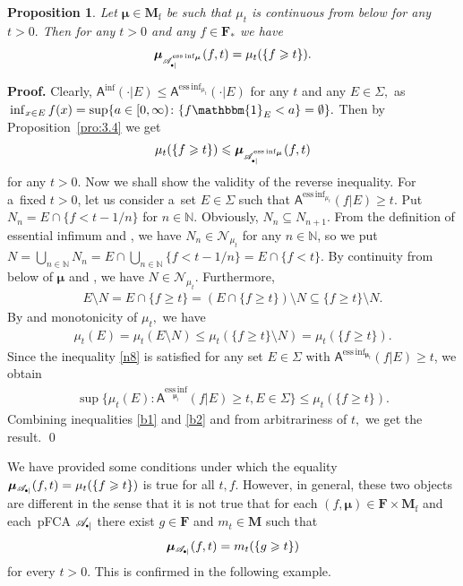 \documentclass[preprint,11pt]{elsarticle}
\newtheorem{proposition}[tw]{Proposition}
\theoremstyle{definition}
\renewenvironment{proof}[1][\textbf{Proof}]{\noindent\textbf{#1.} }{\hfill\qed\vspace{2.5ex}}
\newcommand\mN{{\mathbb N}}
\newcommand\bF{\mathbf{F}} %
\newcommand\bFa{\mathbf{F}_{\ast}} %
\newcommand\bM{\mathbf{M}} %
\newcommand\bMf{\mathbf{M}_{\mathrm{f}}}%
\newcommand\sA{\mathsf{A}}
\newcommand\sbullet[1][.5]{\mathbin{\vcenter{\hbox{\scalebox{#1}{$\bullet$}}}}}
\newcommand\bpA{\mathscr {A}_{\sbullet|}}%
\newcommand\bpeA{\mathscr {A}_{\sbullet|\sbullet}}%
\newcommand{\bmu}{\boldsymbol{\mu}}
\newcommand\bmub[1][\bpeA]{\bmu_{#1}}
\renewcommand\ge{\geqslant}
\renewcommand\le{\leqslant}
\newcommand{\mI}[1]{\mathbbm{1}_{#1}}%
\newcommand{\tx}{\textstyle{}}
\begin{document}
\begin{proposition}
     Let $\bmu\in\bMf$ be such that $\mu_t$ is continuous from below for any $t>0.$
Then for any $t>0$  and any %
$f\in\bFa$ we have
$$
\bmub[\bpA^{\operatorname*{ess\,inf}_{\bmu}}](f,t)=\mu_t(\{f\ge t\}).
$$
\end{proposition}

\begin{proof}
Clearly, $\sA^{\inf}(\cdot|E)\le \sA^{\operatorname*{ess\,inf}_{\mu_t}}(\cdot|E)$ for any $t$ and any $E\in\Sigma,$ as ${\tx \inf_{x\in E}f(x)}=\sup\{a\in  [0,\infty)\colon \{f\mI{E}<a\}=\emptyset\}.$ Then by Proposition~\ref{pro:3.4} we get
\begin{align}\label{b1}
   \mu_t(\{f\ge t\})\le  \bmub[\bpA^{\operatorname*{ess\,inf}_{\bmu}}](f,t)
\end{align}
for any $t>0.$
Now we shall show the validity of the reverse inequality. For a~fixed $t>0$, let us consider a~set $E\in\Sigma$ such that $\sA^{\operatorname*{ess\,inf}_{\mu_t}}(f|E)\ge t$.
Put $N_n=E\cap\{f<t-1/n\}$ for $n\in\mathbb{N}$.
Obviously, $N_n\subseteq N_{n+1}$.
From the definition of essential infimum and \cite[Thm. 2.108\,(iii)]{grabisch2016}, we have $N_n\in\mathcal{N}_{\mu_t}$ for any $n\in \mathbb{N}$, so we put $N=\tx{\bigcup_{n\in\mN} N_n}=\tx{ E\cap \bigcup_{n\in\mN} \{f<t-1/n\}= E\cap \{f<t\}}.$
By continuity from below of $\bmu$ and \cite[Thm. 2.108\,(v)]{grabisch2016}, we have $N\in\mathcal{N}_{\mu_t}$.
Furthermore,
\begin{align*}
    E\setminus N=E\cap \{f\ge t\}=(E\cap \{f\ge t\})\setminus N\subseteq \{f\ge t\}\setminus N.
\end{align*}
By \cite[Thm.~2.108\,(vi)]{grabisch2016} and monotonicity of $\mu_t,$ we have
\begin{align}\label{n8}
    \mu_t(E)=\mu_t(E\setminus N)\le \mu_t(\{f\ge t\}\setminus N)=\mu_t(\{f\ge t\}).
\end{align}
Since the inequality \eqref{n8} is satisfied for any set $E\in\Sigma$ with $\sA^{\operatorname*{ess\,inf}_{\bmu_t}}(f|E)\ge t$, we obtain
\begin{align}\label{b2}
 \sup\{\mu_t(E)\colon\sA^{\operatorname*{ess\,inf}_{\bmu_t}}(f|E)\ge t, E\in\Sigma\}\le \mu_t(\{f\ge t\}).
\end{align}
Combining inequalities \eqref{b1} and \eqref{b2} and from arbitrariness of $t,$ we get the result.
\end{proof}

\medskip
We have provided some conditions under which the equality $\bmub[\bpA](f,t)=\mu_t(\{f\ge t\})$ is true for all $t,f$. However, in general, these two objects are different in the sense that
it is not true that for each $(f,\bmu)\in\bF\times \bMf$ and each~pFCA $\bpA$ there exist $g\in\bF$ and $m_t\in\bM$ such that
$$
\bmub[\bpA](f,t)= m_t(\{g\ge t\})
$$
for every $t>0$.
This is confirmed in the following example.
\end{document}
